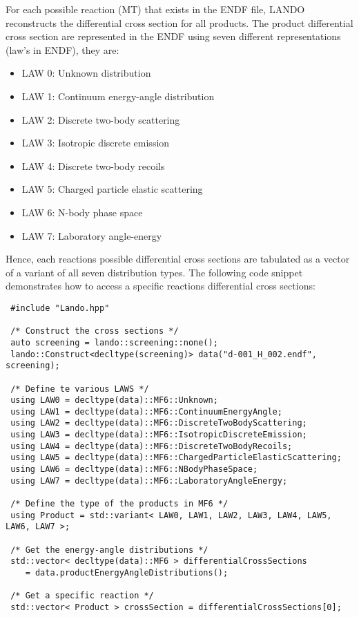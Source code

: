\documentclass[../main.tex]{subfiles}
\begin{document}
For each possible reaction (MT) that exists in the ENDF file, LANDO reconstructs the differential cross section for all products. The product differential cross section are represented in the ENDF using seven different representations (law's in ENDF), they are:
\begin{itemize}
    \item LAW 0: Unknown distribution
    \item LAW 1: Continuum energy-angle distribution
    \item LAW 2: Discrete two-body scattering
    \item LAW 3: Isotropic discrete emission
    \item LAW 4: Discrete two-body recoils
    \item LAW 5: Charged particle elastic scattering
    \item LAW 6: N-body phase space
    \item LAW 7: Laboratory angle-energy
\end{itemize}
Hence, each reactions possible differential cross sections are tabulated as a vector of a variant of all seven distribution types. The following code snippet demonstrates how to access a specific reactions differential cross sections:

\begin{lstlisting}
 #include "Lando.hpp"

 /* Construct the cross sections */
 auto screening = lando::screening::none();
 lando::Construct<decltype(screening)> data("d-001_H_002.endf", screening);
 
 /* Define te various LAWS */
 using LAW0 = decltype(data)::MF6::Unknown;
 using LAW1 = decltype(data)::MF6::ContinuumEnergyAngle;
 using LAW2 = decltype(data)::MF6::DiscreteTwoBodyScattering;
 using LAW3 = decltype(data)::MF6::IsotropicDiscreteEmission;
 using LAW4 = decltype(data)::MF6::DiscreteTwoBodyRecoils;
 using LAW5 = decltype(data)::MF6::ChargedParticleElasticScattering;
 using LAW6 = decltype(data)::MF6::NBodyPhaseSpace;
 using LAW7 = decltype(data)::MF6::LaboratoryAngleEnergy;
 
 /* Define the type of the products in MF6 */
 using Product = std::variant< LAW0, LAW1, LAW2, LAW3, LAW4, LAW5, LAW6, LAW7 >;
 
 /* Get the energy-angle distributions */                  
 std::vector< decltype(data)::MF6 > differentialCrossSections 
    = data.productEnergyAngleDistributions();
    
 /* Get a specific reaction */
 std::vector< Product > crossSection = differentialCrossSections[0];
\end{lstlisting}
\end{document}
